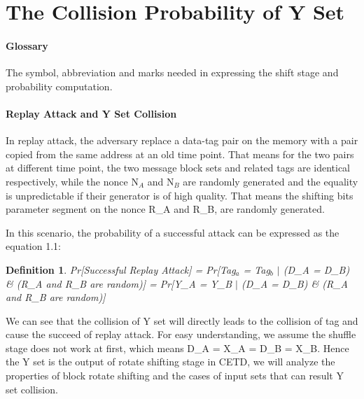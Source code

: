 \documentclass{article}
\newtheorem{defination}{Definition}[section]
\begin{document}
 
\section{The Collision Probability of Y Set}
\paragraph{Glossary} The symbol, abbreviation and marks needed in
expressing the shift stage and probability computation.

\paragraph{Replay Attack and Y Set Collision}
In replay attack, the adversary replace a data-tag pair on the memory with a
pair copied from the same address at an old time point. That means for the two
pairs at different time point, the two message block sets and related tags are
identical respectively, while the nonce N$_A$ and N$_B$ are randomly generated and
the equality is unpredictable if their generator is of high quality.  That means
the shifting bits parameter segment on the nonce R\_A and R\_B, are randomly
generated.

In this scenario, the probability of a successful attack can be expressed as the equation 1.1:
\begin{defination}
Pr[Successful Replay Attack] = Pr[Tag$_a$ = Tag$_b$ $\mid$ (D\_A = D\_B) \& (R\_A and R\_B are random)]
							 = Pr[Y\_A = Y\_B $\mid$ (D\_A = D\_B) \& (R\_A and R\_B are random)]
\end{defination} 

We can see that the collision of Y set will directly leads to the collision of tag and cause the succeed of replay attack. 
For easy understanding, we assume the shuffle stage does not work at first, which means D\_A = X\_A = D\_B = X\_B. Hence the Y set is the output of rotate shifting stage in CETD, we will analyze the properties of block rotate shifting and the cases of input sets that can result Y set collision. 
\end{document}
